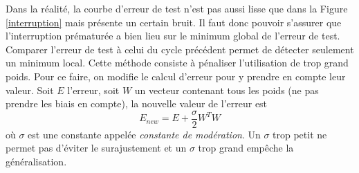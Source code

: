 Dans la réalité, la courbe d'erreur de test n'est pas aussi lisse que dans la Figure \ref{interruption} mais présente un certain bruit.
Il faut donc pouvoir s'assurer que l'interruption prématurée a bien lieu sur le minimum global de l'erreur de test.
Comparer l'erreur de test à celui du cycle précédent permet de détecter seulement un minimum local.
Cette méthode consiste à pénaliser l'utilisation de trop grand poids.
Pour ce faire, on modifie le calcul d'erreur pour y prendre en compte leur valeur\cite{statistica}.
Soit $E$ l'erreur, soit $W$ un vecteur contenant tous les poids (ne pas prendre les biais en compte), la nouvelle valeur de l'erreur est \[E_{new} = E + \frac{\sigma}{2}W^{T}W\]
où $\sigma$ est une constante appelée \emph{constante de modération}.
Un $\sigma$ trop petit ne permet pas d'éviter le surajustement et un $\sigma$ trop grand empêche la généralisation.
